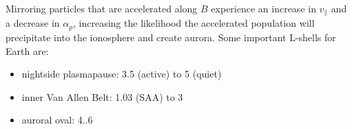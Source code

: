 Mirroring particles that are accelerated along $B$ experience an increase in $v_\parallel$ and a decrease in $\alpha_p$, increasing the likelihood the accelerated population will precipitate into the ionosphere and create aurora.
Some important L-shells for Earth are:
\begin{itemize}
	\item nightside plasmapause: 3.5 (active) to 5 (quiet)
	\item inner Van Allen Belt: 1.03 (SAA) to 3
	\item auroral oval: 4..6
\end{itemize}
